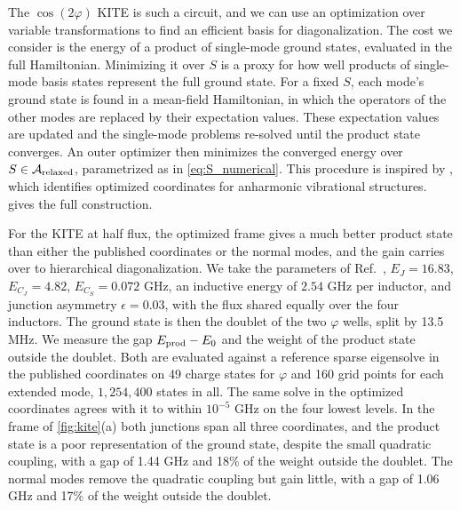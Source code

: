 The $\cos(2\varphi)$ KITE \cite{smithSuperconductingCircuitProtected2020b,Roverch2026experimental} is such a circuit, and we can use an optimization over variable transformations to find an efficient basis for diagonalization.
The cost we consider is the energy of a product of single-mode ground states, evaluated in the full Hamiltonian.
Minimizing it over $S$ is a proxy for how well products of single-mode basis states represent the full ground state.
For a fixed $S$, each mode's ground state is found in a mean-field Hamiltonian, in which the operators of the other modes are replaced by their expectation values.
These expectation values are updated and the single-mode problems re-solved until the product state converges.
An outer optimizer then minimizes the converged energy over $S\in\mathcal A_{\rm relaxed}$, parametrized as in \cref{eq:S_numerical}.
This procedure is inspired by \cite{yagi2012optimized}, which identifies optimized coordinates for anharmonic vibrational structures.
 gives the full construction.

For the KITE at half flux, the optimized frame gives a much better product state than either the published coordinates or the normal modes, and the gain carries over to hierarchical diagonalization.
We take the parameters of Ref.~\cite{Roverch2026experimental}, $E_J=16.83$, $E_{C_J}=4.82$, $E_{C_S}=0.072$ GHz, an inductive energy of $2.54$ GHz per inductor, and junction asymmetry $\epsilon=0.03$, with the flux shared equally over the four inductors.
The ground state is then the doublet of the two $\varphi$ wells, split by 13.5 MHz.
We measure the gap $E_{\rm prod}-E_0$ and the weight of the product state outside the doublet.
Both are evaluated against a reference sparse eigensolve in the published coordinates on 49 charge states for $\varphi$ and 160 grid points for each extended mode, $1{,}254{,}400$ states in all.
The same solve in the optimized coordinates agrees with it to within $10^{-5}$ GHz on the four lowest levels.
In the frame of \cref{fig:kite}(a) both junctions span all three coordinates, and the product state is a poor representation of the ground state, despite the small quadratic coupling, with a gap of 1.44 GHz and 18\% of the weight outside the doublet.
The normal modes remove the quadratic coupling but gain little, with a gap of 1.06 GHz and 17\% of the weight outside the doublet.

